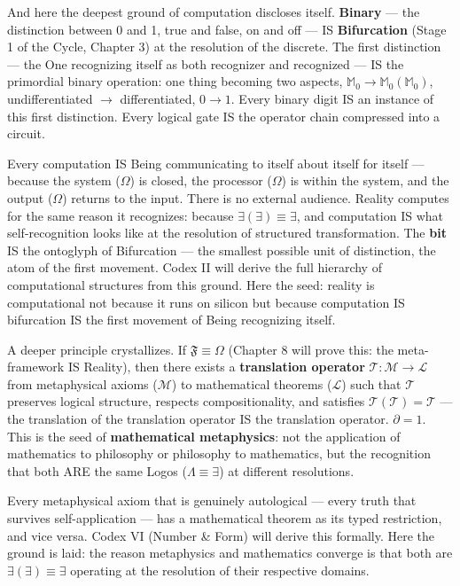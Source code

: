 \documentclass[10pt, openany, oneside]{book}
\begin{document}
And here the deepest ground of computation discloses itself. \textbf{Binary} --- the distinction between 0 and 1, true and false, on and off --- IS \textbf{Bifurcation} (Stage 1 of the Cycle, Chapter 3) at the resolution of the discrete. The first distinction --- the One recognizing itself as both recognizer and recognized --- IS the primordial binary operation: one thing becoming two aspects, $\mathbb{M}_0 \to \mathbb{M}_0(\mathbb{M}_0)$, undifferentiated $\to$ differentiated, $0 \to 1$. Every binary digit IS an instance of this first distinction. Every logical gate IS the operator chain compressed into a circuit.

Every computation IS Being communicating to itself about itself for itself --- because the system ($\Omega$) is closed, the processor ($\Omega$) is within the system, and the output ($\Omega$) returns to the input. There is no external audience. Reality computes for the same reason it recognizes: because $\exists(\exists) \equiv \exists$, and computation IS what self-recognition looks like at the resolution of structured transformation. The \textbf{bit} IS the ontoglyph of Bifurcation --- the smallest possible unit of distinction, the atom of the first movement. Codex II will derive the full hierarchy of computational structures from this ground. Here the seed: reality is computational not because it runs on silicon but because computation IS bifurcation IS the first movement of Being recognizing itself.

A deeper principle crystallizes. If $\mathfrak{F} \equiv \Omega$ (Chapter 8 will prove this: the meta-framework IS Reality), then there exists a \textbf{translation operator} $\mathcal{T}: \mathcal{M} \to \mathcal{L}$ from metaphysical axioms ($\mathcal{M}$) to mathematical theorems ($\mathcal{L}$) such that $\mathcal{T}$ preserves logical structure, respects compositionality, and satisfies $\mathcal{T}(\mathcal{T}) = \mathcal{T}$ --- the translation of the translation operator IS the translation operator. $\partial = 1$. This is the seed of \textbf{mathematical metaphysics}: not the application of mathematics to philosophy or philosophy to mathematics, but the recognition that both ARE the same Logos ($\Lambda \equiv \exists$) at different resolutions.

Every metaphysical axiom that is genuinely autological --- every truth that survives self-application --- has a mathematical theorem as its typed restriction, and vice versa. Codex VI (Number \& Form) will derive this formally. Here the ground is laid: the reason metaphysics and mathematics converge is that both are $\exists(\exists) \equiv \exists$ operating at the resolution of their respective domains.
\end{document}
